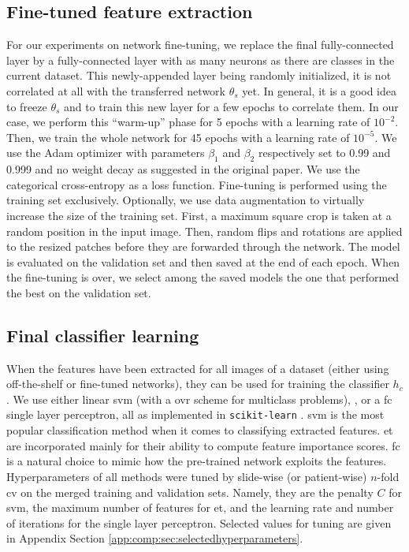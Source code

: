 \subsection{Fine-tuned feature extraction}
\label{ssec:comp:meth_fine_tuning}

For our experiments on network fine-tuning, we replace the final fully-connected layer by a fully-connected layer with as many neurons as there are classes in the current dataset. This newly-appended layer being randomly initialized, it is not correlated at all with the transferred network $\theta_s$ yet. In general, it is a good idea to freeze $\theta_s$ and to train this new layer for a few epochs to correlate them. In our case, we perform this ``warm-up'' phase for 5 epochs with a learning rate of $10^{-2}$. Then, we train the whole network for 45 epochs with a learning rate of $10^{-5}$. We use the Adam optimizer \cite{kingma2014adam} with parameters $\beta_1$ and $\beta_2$ respectively set to 0.99 and 0.999 and no weight decay as suggested in the original paper. We use the categorical cross-entropy as a loss function. Fine-tuning is performed using the training set exclusively. Optionally, we use data augmentation to virtually increase the size of the training set. First, a maximum square crop is taken at a random position in the input image. %
Then, random flips and rotations are applied to the resized patches before they are forwarded through the network. The model is evaluated on the validation set and then saved at the end of each epoch. When the fine-tuning is over, we select among the saved models the one that performed the best on the validation set.

\subsection{Final classifier learning}
\label{ssec:comp:final_classifier}
When the features have been extracted for all images of a dataset (either using off-the-shelf or fine-tuned networks), they can be used for training the classifier $h_c$. 
We use either linear \acrshort{svm} \cite{boser1992training} (with a \acrlong{ovr} scheme for multiclass problems),  \cite{geurts2006extremely}, or a \acrlong{fc} single layer perceptron, all as implemented in \texttt{scikit-learn} \cite{scikit-learn}. \acrshort{svm} is the most popular classification method when it comes to classifying extracted features. \acrshort{et} are incorporated mainly for their ability to compute feature importance scores. \acrshort{fc} is a natural choice to mimic how the pre-trained network exploits the features. Hyperparameters of all methods were tuned by slide-wise (or patient-wise) $n$-fold \acrlong{cv} on the merged training and validation sets. Namely, they are the penalty $C$ for \acrshort{svm}, the maximum number of features for \acrshort{et}, and the learning rate and number of iterations for the single layer perceptron. Selected values for tuning are given in Appendix Section \ref{app:comp:sec:selectedhyperparameters}.

